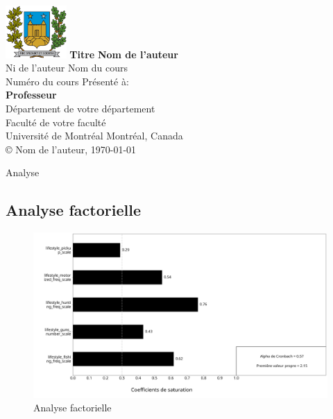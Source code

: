 \documentclass[
  12pt,
]{article}
\author{}
\date{}
\makeatletter
\renewcommand\section{\@startsection{section}{1}{\z@}
  {-3.5ex \@plus -1ex \@minus -.2ex}
  {2.3ex \@plus.2ex}
  {\normalfont\Large\bfseries\centering}}
\makeatother
\begin{document}
\begin{titlepage}
  \newpage{}
  \let\footnotesize\small{}
  \let\footnoterule\relax{}
  \let\footnote\thanks{}

  \baselineskip{}

  \begin{center}
    \setcounter{page}{1}
    \includegraphics[height=20mm,keepaspectratio=true]{img/UdeM_CoA.png}
    \vfil{}
    {\fontsize{17.28}{14}\selectfont \textbf{Titre}}
    \vfil{}
    \textbf{Nom de l'auteur} \\
    Ni de l'auteur
    \vfil{}
    Nom du cours \\ Numéro du cours
    \vfil{}
    Présenté à:\\
    \textbf{Professeur} \\
    \vfil{}
    Département de votre département \\Faculté de votre faculté \\Université de Montréal
    \vfil{}
    \vfil{}
    Montréal, Canada \\
    \vfil{}
    \copyright{} Nom de l'auteur, \today{}
  \end{center}
\end{titlepage}

\section{Analyse}\label{analyse}

\subsection{Analyse factorielle}\label{analyse-factorielle}

\begin{figure}[H]

{\centering \includegraphics[width=1\textwidth,height=\textheight]{../../results/figures/redneck_scale.png}

}

\caption{Analyse factorielle}

\end{figure}%
\end{document}
